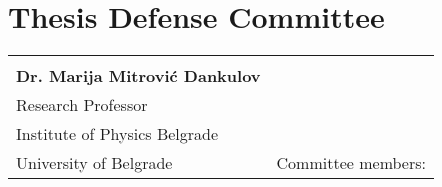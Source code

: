 \normalsize


\chapter*{Thesis Defense Committee}


\begin{tabular}{ll}
\begin{minipage}{.46\textwidth}
Thesis advisor: 
\vspace{.5em} \\
{\textbf{ Dr. Marija Mitrović Dankulov}} \\
Research Professor \\
Institute of Physics Belgrade \\
University of Belgrade
\end{minipage}
& 
\begin{minipage}{.5\textwidth}
Committee members: 
\end{minipage}


\end{tabular}



